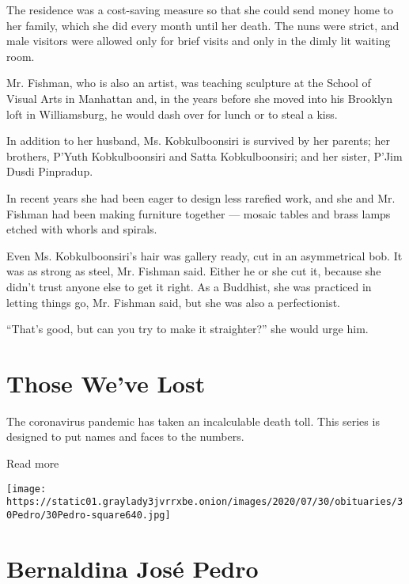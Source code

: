 The residence was a cost-saving measure so that she could send money
home to her family, which she did every month until her death. The nuns
were strict, and male visitors were allowed only for brief visits and
only in the dimly lit waiting room.

Mr. Fishman, who is also an artist, was teaching sculpture at the School
of Visual Arts in Manhattan and, in the years before she moved into his
Brooklyn loft in Williamsburg, he would dash over for lunch or to steal
a kiss.

In addition to her husband, Ms. Kobkulboonsiri is survived by her
parents; her brothers, P'Yuth Kobkulboonsiri and Satta Kobkulboonsiri;
and her sister, P'Jim Dusdi Pinpradup.

In recent years she had been eager to design less rarefied work, and she
and Mr. Fishman had been making furniture together --- mosaic tables and
brass lamps etched with whorls and spirals.

Even Ms. Kobkulboonsiri's hair was gallery ready, cut in an asymmetrical
bob. It was as strong as steel, Mr. Fishman said. Either he or she cut
it, because she didn't trust anyone else to get it right. As a Buddhist,
she was practiced in letting things go, Mr. Fishman said, but she was
also a perfectionist.

``That's good, but can you try to make it straighter?'' she would urge
him.

\href{https://www.nytimes3xbfgragh.onion/interactive/2020/obituaries/people-died-coronavirus-obituaries.html?action=click\&pgtype=Article\&state=default\&region=BELOW_MAIN_CONTENT\&context=covid_obits_promo}{}

\hypertarget{those-weve-lost}{%
\section{Those We've Lost}\label{those-weve-lost}}

The coronavirus pandemic has taken an incalculable death toll. This
series is designed to put names and faces to the numbers.

Read more

\texttt{[image: https://static01.graylady3jvrrxbe.onion/images/2020/07/30/obituaries/30Pedro/30Pedro-square640.jpg]}

\hypertarget{bernaldina-josuxe9-pedro}{%
\section{Bernaldina José Pedro}\label{bernaldina-josuxe9-pedro}}

